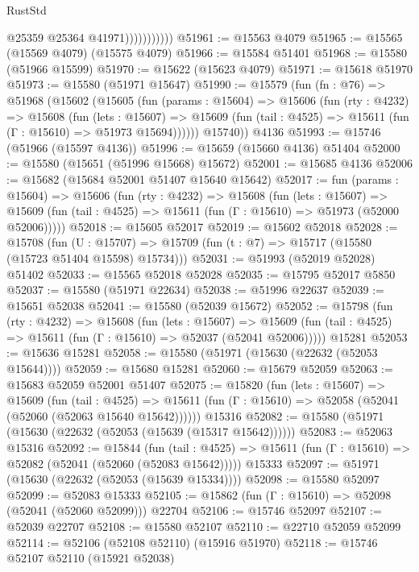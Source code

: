 \begin{lexlean}{RustStd}
\begin{coremodule}
                          @25359
                          @25364
                          @41971)))))))))))
@51961 := @15563 @4079
@51965 := @15565 (@15569 @4079) (@15575 @4079)
@51966 := @15584 @51401
@51968 := @15580 (@51966 @15599)
@51970 := @15622 (@15623 @4079)
@51971 := @15618 @51970
@51973 := @15580 (@51971 @15647)
@51990 := @15579
    (fun (fn : @76) =>
    @51968
      (@15602
        (@15605
          (fun (params : @15604) =>
          @15606
            (fun (rty : @4232) =>
            @15608
              (fun (lets : @15607) =>
              @15609 (fun (tail : @4525) => @15611 (fun (Γ : @15610) => @51973 @15694))))))
        @15740))
    @4136
@51993 := @15746 (@51966 (@15597 @4136))
@51996 := @15659 (@15660 @4136) @51404
@52000 := @15580 (@15651 (@51996 @15668) @15672)
@52001 := @15685 @4136
@52006 := @15682 (@15684 @52001 @51407 @15640 @15642)
@52017 := fun (params : @15604) =>
  @15606
    (fun (rty : @4232) =>
    @15608
      (fun (lets : @15607) =>
      @15609 (fun (tail : @4525) => @15611 (fun (Γ : @15610) => @51973 (@52000 @52006)))))
@52018 := @15605 @52017
@52019 := @15602 @52018
@52028 := @15708
    (fun (U : @15707) => @15709 (fun (t : @7) => @15717 (@15580 (@15723 @51404 @15598) @15734)))
@52031 := @51993 (@52019 @52028) @51402
@52033 := @15565 @52018 @52028
@52035 := @15795 @52017 @5850
@52037 := @15580 (@51971 @22634)
@52038 := @51996 @22637
@52039 := @15651 @52038
@52041 := @15580 (@52039 @15672)
@52052 := @15798
    (fun (rty : @4232) =>
    @15608
      (fun (lets : @15607) =>
      @15609 (fun (tail : @4525) => @15611 (fun (Γ : @15610) => @52037 (@52041 @52006)))))
    @15281
@52053 := @15636 @15281
@52058 := @15580 (@51971 (@15630 (@22632 (@52053 @15644))))
@52059 := @15680 @15281
@52060 := @15679 @52059
@52063 := @15683 @52059 @52001 @51407
@52075 := @15820
    (fun (lets : @15607) =>
    @15609
      (fun (tail : @4525) =>
      @15611 (fun (Γ : @15610) => @52058 (@52041 (@52060 (@52063 @15640 @15642))))))
    @15316
@52082 := @15580 (@51971 (@15630 (@22632 (@52053 (@15639 (@15317 @15642))))))
@52083 := @52063 @15316
@52092 := @15844
    (fun (tail : @4525) => @15611 (fun (Γ : @15610) => @52082 (@52041 (@52060 (@52083 @15642)))))
    @15333
@52097 := @51971 (@15630 (@22632 (@52053 (@15639 @15334))))
@52098 := @15580 @52097
@52099 := @52083 @15333
@52105 := @15862 (fun (Γ : @15610) => @52098 (@52041 (@52060 @52099))) @22704
@52106 := @15746 @52097
@52107 := @52039 @22707
@52108 := @15580 @52107
@52110 := @22710 @52059 @52099
@52114 := @52106 (@52108 @52110) (@15916 @51970)
@52118 := @15746 @52107 @52110 (@15921 @52038)

\end{coremodule}
\end{lexlean}
